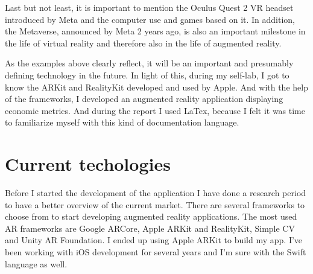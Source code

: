 Last but not least, it is important to mention the Oculus Quest 2 VR headset introduced by Meta and the computer use and games based on it. In addition, the Metaverse, announced by Meta 2 years ago, is also an important milestone in the life of virtual reality and therefore also in the life of augmented reality.

As the examples above clearly reflect, it will be an important and presumably defining technology in the future. In light of this, during my self-lab, I got to know the ARKit and RealityKit developed and used by Apple. And with the help of the frameworks, I developed an augmented reality application displaying economic metrics. And during the report I used LaTex, because I felt it was time to familiarize myself with this kind of documentation language.

\chapter{Current techologies}

Before I started the development of the application I have done a research period to have a better overview of the current market. There are several frameworks to choose from to start developing augmented reality applications. The most used AR frameworks are Google ARCore, Apple ARKit and RealityKit, Simple CV and Unity AR Foundation.
I ended up using Apple ARKit to build my app. I've been working with iOS development for several years and I'm sure with the Swift language as well.
